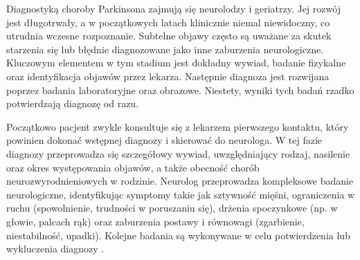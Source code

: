 Diagnostyką choroby Parkinsona zajmują się neurolodzy i geriatrzy.
Jej rozwój jest długotrwały, a w początkowych latach klinicznie niemal niewidoczny, co utrudnia wczesne rozpoznanie.
Subtelne objawy często są uważane za skutek starzenia się lub błędnie diagnozowane jako inne zaburzenia neurologiczne.
Kluczowym elementem w tym stadium jest dokładny wywiad, badanie fizykalne oraz identyfikacja objawów przez lekarza.
Następnie diagnoza jest rozwijana poprzez badania laboratoryjne  oraz obrazowe.
Niestety, wyniki tych badań rzadko potwierdzają diagnozę od razu.

Początkowo pacjent zwykle konsultuje się z lekarzem pierwszego kontaktu, który powinien dokonać wstępnej diagnozy i skierować do neurologa.
W tej fazie diagnozy przeprowadza się szczegółowy wywiad, uwzględniający rodzaj, nasilenie oraz okres występowania objawów, a także
obecność chorób neurozwyrodnieniowych w rodzinie.
Neurolog przeprowadza kompleksowe badanie neurologiczne, identyfikując symptomy takie jak sztywność mięśni, ograniczenia w
ruchu (spowolnienie, trudności w poruszaniu się), drżenia spoczynkowe (np. w głowie, palcach rąk) oraz zaburzenia postawy i równowagi
(zgarbienie, niestabilność, upadki). Kolejne badania są wykonywane w celu potwierdzenia lub wykluczenia diagnozy \cite{diagnostyka_Sitek, Loscalzo_2022}.

